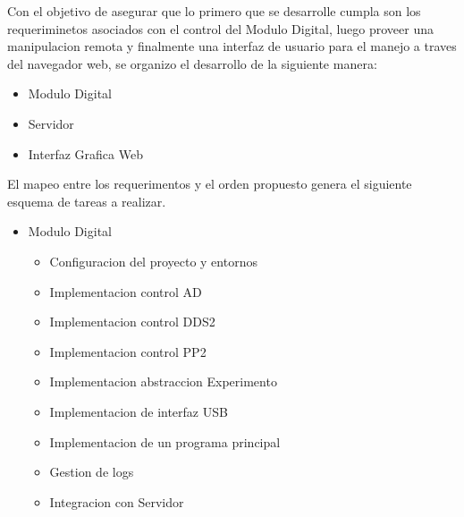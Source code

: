 Con el objetivo de asegurar que lo primero que se desarrolle cumpla son los requeriminetos asociados 
con el control del Modulo Digital, luego proveer una manipulacion remota y finalmente una interfaz de
usuario para el manejo a traves del navegador web, se organizo el desarrollo de la siguiente manera:
\begin{itemize}
    \item Modulo Digital
    \item Servidor 
    \item Interfaz Grafica Web
\end{itemize}
El mapeo entre los requerimentos y el orden propuesto genera el siguiente esquema de tareas a realizar.
\begin{itemize}
    
    \item Modulo Digital
    \begin{itemize}
        \item Configuracion del proyecto y entornos
        \item Implementacion control AD 
        \item Implementacion control DDS2
        \item Implementacion control PP2
        \item Implementacion abstraccion Experimento
        \item Implementacion de interfaz USB
        \item Implementacion de un programa principal
        \item Gestion de logs
        \item Integracion con Servidor
    \end{itemize}


\end{itemize}
